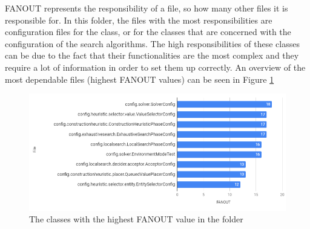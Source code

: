 \begin{itemize}
        FANOUT represents the responsibility of a file, so how many other files it is responsible for. In this folder, the files with the most responsibilities are configuration files for the  class, or for the classes that are concerned with the configuration of the search algorithms. The high responsibilities of these classes can be due to the fact that their functionalities are the most complex and they require a lot of information in order to set them up correctly.
        An overview of the most dependable files (highest FANOUT values) can be seen in Figure \ref{fig:fanoutconfig}
        \begin{figure}[H]
            \centering
            \includegraphics[scale=0.8]{figures/step4/step4.2/FANOUT_config.PNG}
            \caption{The classes with the highest FANOUT value in the  folder}
            \label{fig:fanoutconfig}
        \end{figure}
        

\end{itemize}
